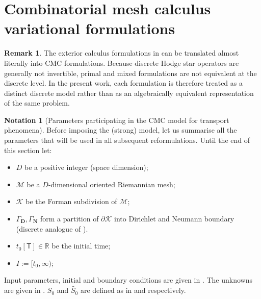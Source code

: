 \documentclass{elsarticle}
\theoremstyle{definition}
\newtheorem{notation}[theorem]{Notation}
\newtheorem{remark}[theorem]{Remark}
\newcommand{\R}{\mathbb{R}}
\renewcommand{\time}{\mathsf{T}}
\newcommand{\Dirichlet}{\mathbf{D}}
\newcommand{\Neumann}{\mathbf{N}}
\begin{document}
\section{Combinatorial mesh calculus variational formulations}
\label{sec:discrete}

\begin{remark}
  The exterior calculus formulations in  can be translated almost literally into CMC formulations.
  Because discrete Hodge star operators are generally not invertible, primal
  and mixed formulations are not equivalent at the discrete level.
  In the present work, each formulation is therefore treated as a distinct
  discrete model rather than as an algebraically equivalent representation of
  the same problem.
\end{remark}
\begin{notation}[Parameters participating in the CMC model for transport phenomena]
  \label{notation:discrete/parameters}
  Before imposing the (strong) model, let us summarise all the parameters that will be used in all subsequent reformulations.
  Until the end of this section let:
  \begin{itemize}
    \item
      $D$ be a positive integer (space dimension);
    \item
      $\mathcal{M}$ be a $D$-dimensional oriented Riemannian mesh;
    \item
      $\mathcal{K}$ be the Forman subdivision of $\mathcal{M}$;
    \item
      $\Gamma_{\Dirichlet}, \Gamma_{\Neumann}$ form a partition of $\partial \mathcal{K}$ into Dirichlet and Neumann boundary
      (discrete analogue of ).
    \item
      $t_0 [\time] \in \R$ be the initial time;
    \item
      $I := [t_0, \infty)$;
  \end{itemize}
  Input parameters, initial and boundary conditions are given in .
  The unknowns are given in .
  $S_0$ and $\widetilde{S_0}$ are defined as in
   and
   respectively.
\end{notation}
\end{document}
